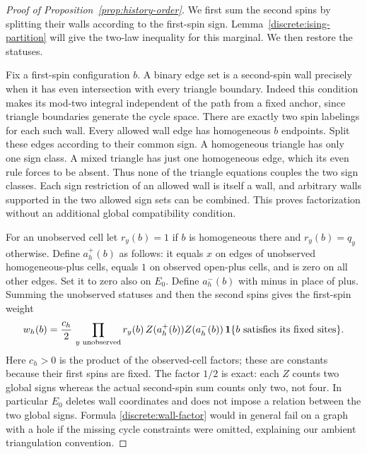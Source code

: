 \begin{proof}[Proof of Proposition~\ref{prop:history-order}]
We first sum the second spins by splitting their walls according to the
first-spin sign.  Lemma~\ref{discrete:ising-partition} will give the
two-law inequality for this marginal.  We then restore the statuses.

Fix a first-spin configuration $b$. A binary edge set is a second-spin
wall precisely when it has even intersection with every triangle boundary.
Indeed this condition makes its mod-two integral independent of the path
from a fixed anchor, since triangle boundaries generate the cycle space.
There are exactly two spin labelings for each such wall. Every allowed wall
edge has homogeneous $b$ endpoints. Split these edges according to their
common sign. A homogeneous triangle has only one sign class. A mixed
triangle has just one homogeneous edge, which its even rule forces to be
absent. Thus none of the triangle equations couples the two sign classes.
Each sign restriction of an allowed wall is itself a wall, and arbitrary
walls supported in the two allowed sign sets can be combined. This proves
factorization without an additional global compatibility condition.

For an unobserved cell let
$r_y(b)=1$ if $b$ is homogeneous there and $r_y(b)=q_y$ otherwise.
Define $a_h^+(b)$ as follows: it equals $x$ on edges of unobserved
homogeneous-plus cells, equals $1$ on observed open-plus cells, and is zero
on all other edges. Set it to zero also on $E_0$. Define $a_h^-(b)$ with
minus in place of plus. Summing the unobserved statuses and then the second
spins gives the first-spin weight
\begin{equation}\label{discrete:wall-factor}
 w_h(b)=\frac{c_h}{2}\,
   \prod_{y\text{ unobserved}}r_y(b)\,
   Z(a_h^+(b))Z(a_h^-(b))\,
   \mathbf 1\{b\text{ satisfies its fixed sites}\}.
\end{equation}
Here $c_h>0$ is the product of the observed-cell factors; these are
constants because their first spins are fixed. The factor $1/2$ is exact:
each $Z$ counts two global signs whereas the actual second-spin sum counts
only two, not four. In particular $E_0$ deletes wall coordinates and does
not impose a relation between the two global signs. Formula
\eqref{discrete:wall-factor} would in general fail on a graph with a hole
if the missing cycle constraints were omitted, explaining our ambient
triangulation convention.


\end{proof}
